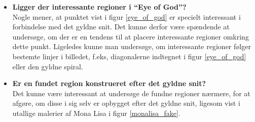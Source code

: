 {\begin{itemize}
        Denne oplæring kunne med fordel gøres i samarbejde med
        kunsthistorikere og andre med den fornødne viden til at afgøre
        dette. Her er det oplagt at udvikle en GUI, hvor brugeren kan
        markere de områder (eller figurer) i billedet, som er
        interessante.
    \item \textbf{Ligger der interessante regioner i ``Eye of God''?}\\
        Nogle mener, at punktet vist i figur \ref{eye_of_god} er
        specielt interessant i forbindelse med det gyldne snit. Det
        kunne derfor være spændende at undersøge, om der er en tendens
        til at placere interessante regioner omkring dette punkt.
        Ligeledes kunne man undersøge, om
        interessante regioner følger bestemte linjer i billedet, f.eks,
        diagonalerne indtegnet i figur \ref{eye_of_god} eller den gyldne
        spiral.
    \item \textbf{Er en fundet region konstrueret efter det gyldne snit?}\\
        Det kunne være interessant at undersøge de fundne regioner
        nærmere, for at afgøre, om disse i sig selv er opbygget efter
        det gyldne snit, ligesom vist i utallige malerier af Mona Lisa i
        figur \ref{monalisa_fake}.
\end{itemize}

}
